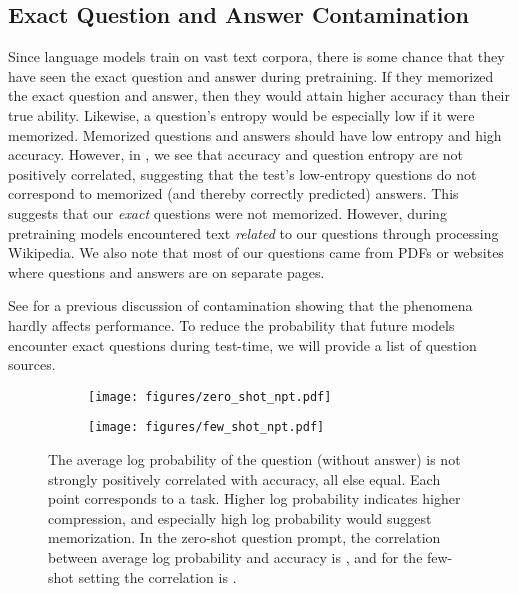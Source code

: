 \documentclass{article} \usepackage{iclr2021_conference, times}
\begin{document}
\subsection{Exact Question and Answer Contamination}
Since language models train on vast text corpora, there is some chance that they have seen the exact question and answer during pretraining. If they memorized the exact question and answer, then they would attain higher accuracy than their true ability. Likewise, a question's entropy would be especially low if it were memorized. Memorized questions and answers should have low entropy and high accuracy. However, in , we see that accuracy and question entropy are not positively correlated, suggesting that the test's low-entropy questions do not correspond to memorized (and thereby correctly predicted) answers. This suggests that our \emph{exact} questions were not memorized. However, during pretraining models encountered text \emph{related} to our questions through processing Wikipedia. We also note that most of our questions came from PDFs or websites where questions and answers are on separate pages.

See \cite{brown2020gpt3} for a previous discussion of contamination showing that the phenomena hardly affects performance. To reduce the probability that future models encounter exact questions during test-time, we will provide a list of question sources.


\begin{figure}[h]
\begin{subfigure}{.49\textwidth}
\centering
    \texttt{[image: figures/zero\_shot\_npt.pdf]}
\end{subfigure}\hfill \begin{subfigure}{.49\textwidth}
\centering
    \texttt{[image: figures/few\_shot\_npt.pdf]}
\end{subfigure}
\caption{The average log probability of the question (without answer) is not strongly positively correlated with accuracy, all else equal. Each point corresponds to a task. Higher log probability indicates higher compression, and especially high log probability would suggest memorization. In the zero-shot question prompt, the correlation between average log probability and accuracy is , and for the few-shot setting the correlation is .}\label{fig:zeroshotnpt}
\end{figure}
\end{document}
